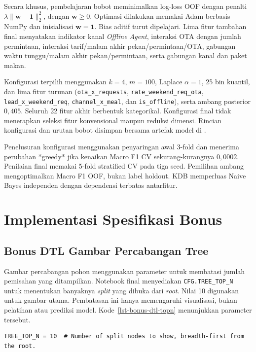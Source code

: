 Secara khusus, pembelajaran bobot meminimalkan log-loss OOF dengan penalti
$\lambda\lVert\mathbf{w}-\mathbf{1}\rVert_2^2$, dengan
$\mathbf{w}\geq 0$. Optimasi dilakukan memakai Adam berbasis NumPy dan
inisialisasi $\mathbf{w}=\mathbf{1}$. Bias aditif turut dipelajari.
Lima fitur tambahan final menyatakan indikator kanal \textit{Offline Agent},
interaksi OTA dengan jumlah permintaan, interaksi tarif/malam akhir
pekan/permintaan/OTA, gabungan waktu tunggu/malam akhir pekan/permintaan,
serta gabungan kanal dan paket makan.

Konfigurasi terpilih menggunakan $k=4$, $m=100$, Laplace $\alpha=1$,
25 bin kuantil, dan lima fitur turunan
(\texttt{ota\_x\_requests}, \texttt{rate\_weekend\_req\_ota},
\texttt{lead\_x\_weekend\_req}, \texttt{channel\_x\_meal}, dan
\texttt{is\_offline}), serta ambang posterior $0{,}405$. Seluruh 22 fitur
akhir berbentuk kategorikal. Konfigurasi final tidak menerapkan seleksi fitur
konvensional maupun reduksi dimensi. Rincian konfigurasi dan urutan bobot
disimpan bersama artefak model di
.

Penelusuran konfigurasi menggunakan penyaringan awal 3-fold dan menerima
perubahan *greedy* jika kenaikan Macro F1 CV sekurang-kurangnya $0{,}0002$.
Penilaian final memakai 5-fold stratified CV pada tiga seed. Pemilihan
ambang mengoptimalkan Macro F1 OOF, bukan label holdout. KDB memperluas
Naive Bayes independen dengan dependensi terbatas antarfitur.
\section{Implementasi Spesifikasi Bonus}

\subsection{Bonus DTL Gambar Percabangan Tree}
\label{sec-bonus-dtl-implementasi}

Gambar percabangan pohon menggunakan parameter untuk membatasi jumlah pemisahan yang ditampilkan. Notebook final menyediakan \texttt{CFG.TREE\_TOP\_N} untuk menentukan banyaknya \textit{split} yang dibuka dari \textit{root}. Nilai 10 digunakan untuk gambar utama. Pembatasan ini hanya memengaruhi visualisasi, bukan pelatihan atau prediksi model. Kode~\ref{lst-bonus-dtl-topn} menunjukkan parameter tersebut.

\begin{lstlisting}[caption={Parameter jumlah split pada gambar DTL},label={lst-bonus-dtl-topn}]
TREE_TOP_N = 10  # Number of split nodes to show, breadth-first from the root.
\end{lstlisting}


